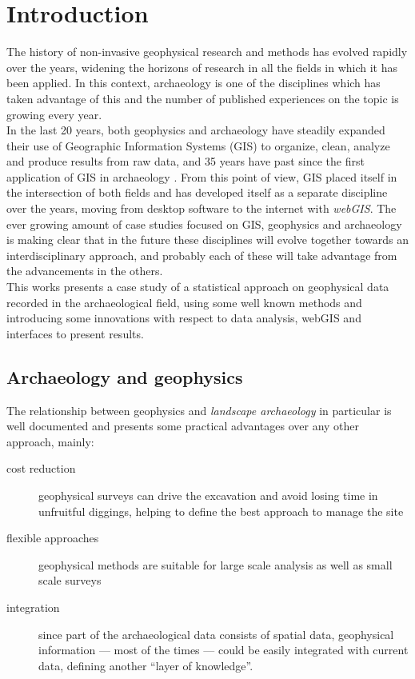 \chapter{Introduction}

    \begin{chaptersum}
        \blindtext[2]
    \end{chaptersum}

    The history of non-invasive geophysical research and methods has evolved rapidly over the years, widening the horizons of research in all the fields in which it has been applied. In this context, archaeology is one of the disciplines which has taken advantage of this and the number of published experiences on the topic is growing every year.\\
    In the last 20 years, both geophysics and archaeology have steadily expanded their use of Geographic Information Systems (GIS) to organize, clean, analyze and produce results from raw data, and 35 years have past since the first application of GIS in archaeology \cite[pp.~2--3]{kvamme1995}. From this point of view, GIS placed itself in the intersection of both fields and has developed itself as a separate discipline over the years, moving from desktop software to the internet with \emph{webGIS}. The ever growing amount of case studies focused on GIS, geophysics and archaeology is making clear that in the future these disciplines will evolve together towards an interdisciplinary approach, and probably each of these will take advantage from the advancements in the others.\\
    This works presents a case study of a statistical approach on geophysical data recorded in the archaeological field, using some well known methods and introducing some innovations with respect to data analysis, webGIS and interfaces to present results. 
    \section{Archaeology and geophysics}
        The relationship between geophysics and \emph{landscape archaeology} in particular is well documented and presents some practical advantages over any other approach, mainly:
        \begin{description}
            \item[cost reduction] geophysical surveys can drive the excavation and avoid losing time in unfruitful diggings, helping to define the best approach to manage the site
            \item[flexible approaches] geophysical methods are suitable for large scale analysis as well as small scale surveys
            \item[integration] since part of the archaeological data consists of spatial data, geophysical information --- most of the times --- could be easily integrated with current data, defining another ``layer of knowledge''.
        \end{description}

